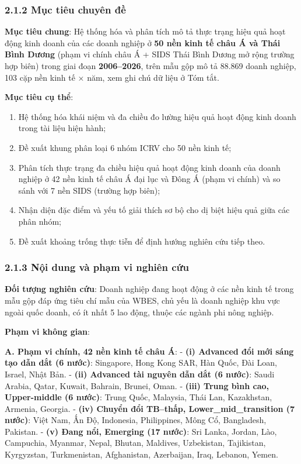 \documentclass[
  a4paper,
  13pt]{extreport}
\providecommand{\tightlist}{%
  \setlength{\itemsep}{0pt}\setlength{\parskip}{0pt}}
\begin{document}
\hypertarget{mux1ee5c-tiuxeau-chuyuxean-ux111ux1ec1}{%
\subsubsection{2.1.2 Mục tiêu chuyên
đề}\label{mux1ee5c-tiuxeau-chuyuxean-ux111ux1ec1}}

\textbf{Mục tiêu chung}: Hệ thống hóa và phân tích mô tả thực trạng hiệu
quả hoạt động kinh doanh của các doanh nghiệp ở \textbf{50 nền kinh tế
châu Á và Thái Bình Dương} (phạm vi chính châu Á + SIDS Thái Bình Dương
mở rộng trường hợp biên) trong giai đoạn \textbf{2006--2026}, trên mẫu
gộp mô tả 88.869 doanh nghiệp, 103 cặp nền kinh tế × năm, xem ghi chú dữ
liệu ở Tóm tắt.

\textbf{Mục tiêu cụ thể}:

\begin{enumerate}
\def\labelenumi{\arabic{enumi}.}
\tightlist
\item
  Hệ thống hóa khái niệm và đa chiều đo lường hiệu quả hoạt động kinh
  doanh trong tài liệu hiện hành;
\item
  Đề xuất khung phân loại 6 nhóm ICRV cho 50 nền kinh tế;
\item
  Phân tích thực trạng đa chiều hiệu quả hoạt động kinh doanh của doanh
  nghiệp ở 42 nền kinh tế châu Á đại lục và Đông Á (phạm vi chính) và so
  sánh với 7 nền SIDS (trường hợp biên);
\item
  Nhận diện đặc điểm và yếu tố giải thích sơ bộ cho dị biệt hiệu quả
  giữa các phân nhóm;
\item
  Đề xuất khoảng trống thực tiễn để định hướng nghiên cứu tiếp theo.
\end{enumerate}

\hypertarget{nux1ed9i-dung-vuxe0-phux1ea1m-vi-nghiuxean-cux1ee9u}{%
\subsubsection{2.1.3 Nội dung và phạm vi nghiên
cứu}\label{nux1ed9i-dung-vuxe0-phux1ea1m-vi-nghiuxean-cux1ee9u}}

\textbf{Đối tượng nghiên cứu}: Doanh nghiệp đang hoạt động ở các nền
kinh tế trong mẫu gộp đáp ứng tiêu chí mẫu của WBES, chủ yếu là doanh
nghiệp khu vực ngoài quốc doanh, có ít nhất 5 lao động, thuộc các ngành
phi nông nghiệp.

\textbf{Phạm vi không gian}:

\textbf{A. Phạm vi chính, 42 nền kinh tế châu Á}: - \textbf{(i) Advanced
đổi mới sáng tạo dẫn dắt (6 nước)}: Singapore, Hong Kong SAR, Hàn Quốc,
Đài Loan, Israel, Nhật Bản. - \textbf{(ii) Advanced tài nguyên dẫn dắt
(6 nước)}: Saudi Arabia, Qatar, Kuwait, Bahrain, Brunei, Oman. -
\textbf{(iii) Trung bình cao, Upper-middle (6 nước)}: Trung Quốc,
Malaysia, Thái Lan, Kazakhstan, Armenia, Georgia. - \textbf{(iv) Chuyển
đổi TB--thấp, Lower\_mid\_transition (7 nước)}: Việt Nam, Ấn Độ,
Indonesia, Philippines, Mông Cổ, Bangladesh, Pakistan. - \textbf{(v)
Đang nổi, Emerging (17 nước)}: Sri Lanka, Jordan, Lào, Campuchia,
Myanmar, Nepal, Bhutan, Maldives, Uzbekistan, Tajikistan, Kyrgyzstan,
Turkmenistan, Afghanistan, Azerbaijan, Iraq, Lebanon, Yemen.
\end{document}
